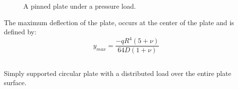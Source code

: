 \documentclass[10pt,letterpaper]{report}
\numberwithin{equation}{chapter}
\begin{document}
\begin{figure}[!ht]
\centering
\label{fig:ppd}
    \hfill
    \caption{A pinned plate under a pressure load.}
    \label{fig:dummy}
\end{figure}
The maximum deflection of the plate, occurs at the center of the plate and is defined by:
\[y_{max} = \frac{-q R^4 (5+ \nu)}{64D(1+\nu)}\]

\newpage
\subsection{}
\label{subsec:fpd} %
Simply supported circular plate with a distributed load over the entire plate surface.
\end{document}
